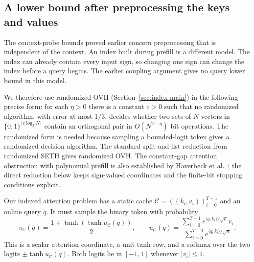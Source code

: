 \subsection{A lower bound after preprocessing the keys and values}
\label{sec:indexedlower}

The context-probe bounds proved earlier concern preprocessing that is
independent of the context.  An index built during prefill is a different
model.  The index can already contain every input sign, so changing one
sign can change the index before a query begins.  The earlier coupling
argument gives no query lower bound in this model.

We therefore use randomized OVH (Section~\ref{sec:index-main}) in
the following precise form: for each $\eta>0$ there is a constant $c>0$
such that no randomized algorithm, with error at most $1/3$, decides
whether two sets of $N$ vectors in $\{0,1\}^{\lceil c\log_2N\rceil}$
contain an orthogonal pair in $O(N^{2-\eta})$ bit operations.
The randomized form is needed because sampling a bounded-logit token
gives a randomized decision algorithm.  The standard split-and-list
reduction from randomized SETH gives randomized OVH.  The constant-gap
attention obstruction with polynomial prefill is also established by
Haverbeck et al.~\cite[Theorem 4.1 and Lemma A.5]{haverbeck2026attention}; the
direct reduction below keeps sign-valued coordinates and the
finite-bit stopping conditions explicit.

Our indexed attention problem has a static cache
$\mathcal C=((k_i,v_i))_{i=0}^{T-1}$ and an online query $q$.  It must
sample the binary token with probability
\begin{equation}
 \pi_{\mathcal C}(q)
 =\frac{1+\tanh(\tanh u_{\mathcal C}(q))}{2},
 \qquad
 u_{\mathcal C}(q)
 =\frac{\sum_{i=0}^{T-1}e^{\langle q,k_i\rangle/\sqrt n}v_i}
 {\sum_{i=0}^{T-1}e^{\langle q,k_i\rangle/\sqrt n}}.
 \label{eq:indexedtarget}
\end{equation}
This is a scalar attention coordinate, a unit tanh row, and a softmax
over the two logits $\pm\tanh u_{\mathcal C}(q)$.  Both logits lie in
$[-1,1]$ whenever $|v_i|\le1$.

